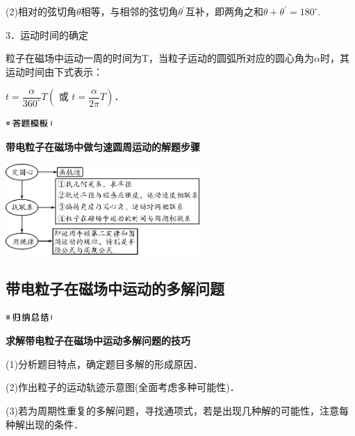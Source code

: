 \documentclass[cn,10.5pt,chinese,mac,chinesefont=founder]{elegantbook}
\begin{document}
(2)相对的弦切角$\theta$相等，与相邻的弦切角$\theta^\prime$互补，即两角之和$\theta+\theta^\prime=180^\circ$.

3．运动时间的确定

粒子在磁场中运动一周的时间为T，当粒子运动的圆弧所对应的圆心角为$\alpha$时，其运动时间由下式表示：

$t=\dfrac{\alpha}{360^{\circ}} T\left(\text { 或 } t=\dfrac{\alpha}{2 \pi} T\right)$．

\begin{center}\includegraphics[width=0.70764in,height=0.12292in]{media/image25.png}\end{center}
\begin{center}
	\textbf{带电粒子在磁场中做匀速圆周运动的解题步骤}
\end{center}

\begin{center}\includegraphics[width=2.90556in,height=1.36806in]{media/image355.png}\end{center}

\subsection{带电粒子在磁场中运动的多解问题}

\begin{center}\includegraphics[width=0.70764in,height=0.12292in]{media/image13.png}\end{center}
\begin{center}
	\textbf{求解带电粒子在磁场中运动多解问题的技巧}
\end{center}

(1)分析题目特点，确定题目多解的形成原因．

(2)作出粒子的运动轨迹示意图(全面考虑多种可能性)．

(3)若为周期性重复的多解问题，寻找通项式，若是出现几种解的可能性，注意每种解出现的条件．
\end{document}
